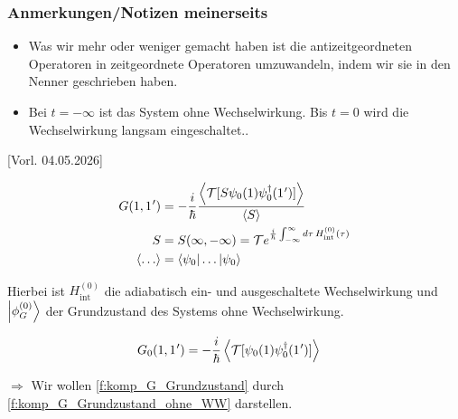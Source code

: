 \subsubsection*{Anmerkungen/Notizen meinerseits}
\begin{itemize}
  \item Was wir mehr oder weniger gemacht haben ist die antizeitgeordneten Operatoren in zeitgeordnete Operatoren umzuwandeln, indem wir sie in den Nenner geschrieben haben.

  \item Bei $t = -\infty$ ist das System ohne Wechselwirkung. Bis $t = 0$ wird die Wechselwirkung langsam eingeschaltet..
\end{itemize}

[Vorl. 04.05.2026]


\begin{equation}\label{f:komp_G_Grundzustand}
  \begin{aligned}
    G(1,1\mkern1mu')       & = -\frac{i}{\hbar}\frac{\left\langle\mathcal{T}[S\psi_0(1)\psi_0^\dagger(1\mkern1mu')]\right\rangle}{\left\langle S\right\rangle}                     \\
    S                      & = S(\infty,-\infty) = \mathcal T e^{\frac{i}{\hbar}\int_{-\infty}^{\infty}d\tau\,H_{\mathrm{int}}^{(0)}(\tau)} \\
    \langle \ldots \rangle & = \left\langle\psi_0\right| \ldots \left|\psi_0\right\rangle
  \end{aligned}
\end{equation}

Hierbei ist $H_{\mathrm{int}}^{(0)}$ die adiabatisch ein- und ausgeschaltete Wechselwirkung und $\left|\phi_G^{(0)}\right\rangle$ der Grundzustand des Systems ohne Wechselwirkung.


\begin{equation}\label{f:komp_G_Grundzustand_ohne_WW}
  \begin{aligned}
    G_0(1,1\mkern1mu') & = -\frac{i}{\hbar}\left\langle\mathcal{T}[\psi_0(1)\psi_0^\dagger(1\mkern1mu')]\right\rangle
  \end{aligned}
\end{equation}

$\Rightarrow$ Wir wollen \autoref{f:komp_G_Grundzustand} durch \autoref{f:komp_G_Grundzustand_ohne_WW} darstellen.

